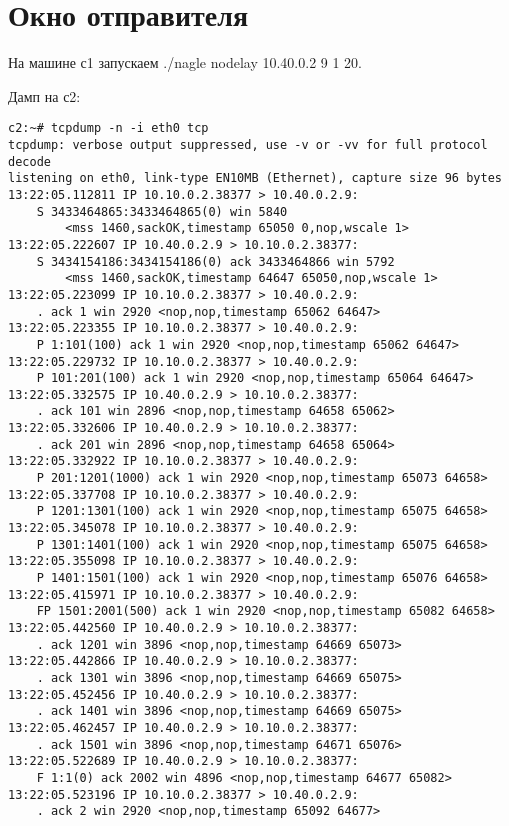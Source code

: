 \documentclass[a4paper,12pt]{article}
\begin{document}
\section{Окно отправителя}

На машине с1 запускаем ./nagle nodelay 10.40.0.2 9 1 20.

Дамп на с2:
\begin{Verbatim}
c2:~# tcpdump -n -i eth0 tcp
tcpdump: verbose output suppressed, use -v or -vv for full protocol decode
listening on eth0, link-type EN10MB (Ethernet), capture size 96 bytes
13:22:05.112811 IP 10.10.0.2.38377 > 10.40.0.2.9: 
    S 3433464865:3433464865(0) win 5840 
        <mss 1460,sackOK,timestamp 65050 0,nop,wscale 1>
13:22:05.222607 IP 10.40.0.2.9 > 10.10.0.2.38377: 
    S 3434154186:3434154186(0) ack 3433464866 win 5792 
        <mss 1460,sackOK,timestamp 64647 65050,nop,wscale 1>
13:22:05.223099 IP 10.10.0.2.38377 > 10.40.0.2.9: 
    . ack 1 win 2920 <nop,nop,timestamp 65062 64647>
13:22:05.223355 IP 10.10.0.2.38377 > 10.40.0.2.9: 
    P 1:101(100) ack 1 win 2920 <nop,nop,timestamp 65062 64647>
13:22:05.229732 IP 10.10.0.2.38377 > 10.40.0.2.9: 
    P 101:201(100) ack 1 win 2920 <nop,nop,timestamp 65064 64647>
13:22:05.332575 IP 10.40.0.2.9 > 10.10.0.2.38377: 
    . ack 101 win 2896 <nop,nop,timestamp 64658 65062>
13:22:05.332606 IP 10.40.0.2.9 > 10.10.0.2.38377: 
    . ack 201 win 2896 <nop,nop,timestamp 64658 65064>
13:22:05.332922 IP 10.10.0.2.38377 > 10.40.0.2.9: 
    P 201:1201(1000) ack 1 win 2920 <nop,nop,timestamp 65073 64658>
13:22:05.337708 IP 10.10.0.2.38377 > 10.40.0.2.9: 
    P 1201:1301(100) ack 1 win 2920 <nop,nop,timestamp 65075 64658>
13:22:05.345078 IP 10.10.0.2.38377 > 10.40.0.2.9: 
    P 1301:1401(100) ack 1 win 2920 <nop,nop,timestamp 65075 64658>
13:22:05.355098 IP 10.10.0.2.38377 > 10.40.0.2.9: 
    P 1401:1501(100) ack 1 win 2920 <nop,nop,timestamp 65076 64658>
13:22:05.415971 IP 10.10.0.2.38377 > 10.40.0.2.9: 
    FP 1501:2001(500) ack 1 win 2920 <nop,nop,timestamp 65082 64658>
13:22:05.442560 IP 10.40.0.2.9 > 10.10.0.2.38377: 
    . ack 1201 win 3896 <nop,nop,timestamp 64669 65073>
13:22:05.442866 IP 10.40.0.2.9 > 10.10.0.2.38377: 
    . ack 1301 win 3896 <nop,nop,timestamp 64669 65075>
13:22:05.452456 IP 10.40.0.2.9 > 10.10.0.2.38377: 
    . ack 1401 win 3896 <nop,nop,timestamp 64669 65075>
13:22:05.462457 IP 10.40.0.2.9 > 10.10.0.2.38377: 
    . ack 1501 win 3896 <nop,nop,timestamp 64671 65076>
13:22:05.522689 IP 10.40.0.2.9 > 10.10.0.2.38377: 
    F 1:1(0) ack 2002 win 4896 <nop,nop,timestamp 64677 65082>
13:22:05.523196 IP 10.10.0.2.38377 > 10.40.0.2.9: 
    . ack 2 win 2920 <nop,nop,timestamp 65092 64677>
\end{Verbatim}
\end{document}
